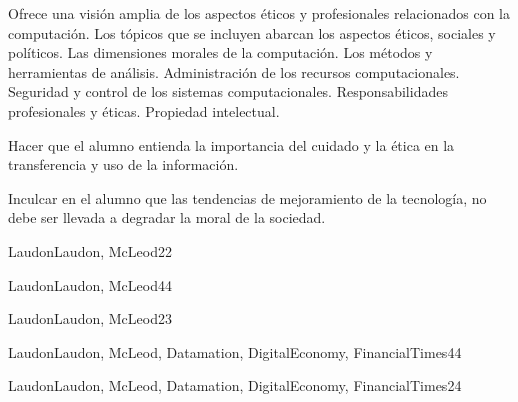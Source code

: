 \begin{syllabus}


\begin{justification}
Ofrece una visión amplia de los aspectos éticos y profesionales relacionados con la computación. Los tópicos que se incluyen abarcan los aspectos éticos, sociales y políticos. Las dimensiones morales de la computación. Los métodos y herramientas de análisis. Administración de los recursos computacionales. Seguridad y control de los sistemas computacionales. Responsabilidades profesionales y éticas. Propiedad intelectual.
\end{justification}

\begin{goals}
\item Hacer que el alumno entienda la importancia del cuidado y la ética en la transferencia y uso de la información.
\item Inculcar en el alumno que las tendencias de mejoramiento de la tecnología, no debe ser llevada a degradar la moral de la sociedad. 
\end{goals}

\begin{outcomes}
\end{outcomes}

\begin{unit}{\SPHistoryOfComputingDef}{LaudonLaudon, McLeod}{2}{2}
	\SPHistoryOfComputingAllTopics
	\SPHistoryOfComputingAllObjectives
\end{unit}

\begin{unit}{\SPSocialContextDef}{LaudonLaudon, McLeod}{4}{4}
	\SPSocialContextAllTopics
	\SPSocialContextAllObjectives
\end{unit}

\begin{unit}{\SPAnalyticalToolsDef}{LaudonLaudon, McLeod}{2}{3}
	\SPAnalyticalToolsAllTopics
	\SPAnalyticalToolsAllObjectives
\end{unit}

\begin{unit}{\SPProfessionalEthicsDef}{LaudonLaudon, McLeod, Datamation, DigitalEconomy, FinancialTimes}{4}{4}
	\SPProfessionalEthicsAllTopics
	\SPProfessionalEthicsAllObjectives
\end{unit}

\begin{unit}{\SPRisksDef}{LaudonLaudon, McLeod, Datamation, DigitalEconomy, FinancialTimes}{2}{4}
	\SPRisksAllTopics
	\SPRisksAllObjectives
\end{unit}


\end{syllabus}
